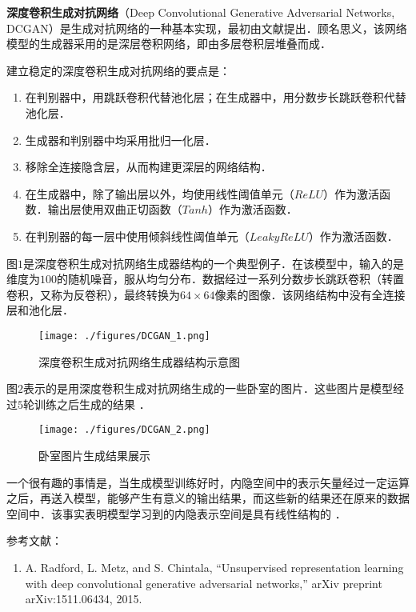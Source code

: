 
\textbf{深度卷积生成对抗网络}（Deep Convolutional Generative Adversarial Networks, DCGAN）是生成对抗网络的一种基本实现，最初由文献\cite{DCGAN}提出．顾名思义，该网络模型的生成器采用的是深层卷积网络，即由多层卷积层堆叠而成．

建立稳定的深度卷积生成对抗网络的要点是\cite{DCGAN}：
\begin{enumerate}
\item 在判别器中，用跳跃卷积代替池化层；在生成器中，用分数步长跳跃卷积代替池化层．
\item 生成器和判别器中均采用批归一化层．
\item 移除全连接隐含层，从而构建更深层的网络结构．
\item 在生成器中，除了输出层以外，均使用线性阈值单元（$ReLU$）作为激活函数．输出层使用双曲正切函数（$Tanh$）作为激活函数．
\item 在判别器的每一层中使用倾斜线性阈值单元（$Leaky ReLU$）作为激活函数．
\end{enumerate}

图$1$是深度卷积生成对抗网络生成器结构的一个典型例子．在该模型中，输入的是维度为$100$的随机噪音，服从均匀分布．数据经过一系列分数步长跳跃卷积（转置卷积，又称为反卷积），最终转换为$64 \times64$像素的图像．该网络结构中没有全连接层和池化层．
\begin{figure}[ht]
\centering
\texttt{[image: ./figures/DCGAN\_1.png]}
\caption{深度卷积生成对抗网络生成器结构示意图 \cite{DCGAN}} \label{DCGAN_fig1}
\end{figure}

图$2$表示的是用深度卷积生成对抗网络生成的一些卧室的图片．这些图片是模型经过$5$轮训练之后生成的结果 \cite{DCGAN}．
\begin{figure}[ht]
\centering
\texttt{[image: ./figures/DCGAN\_2.png]}
\caption{卧室图片生成结果展示} \label{DCGAN_fig2}
\end{figure}

一个很有趣的事情是，当生成模型训练好时，内隐空间中的表示矢量经过一定运算之后，再送入模型，能够产生有意义的输出结果，而这些新的结果还在原来的数据空间中．该事实表明模型学习到的内隐表示空间是具有线性结构的 \cite{DCGAN}．




参考文献：
\begin{enumerate}
\item A. Radford, L. Metz, and S. Chintala, “Unsupervised representation learning with deep convolutional generative adversarial networks,” arXiv preprint arXiv:1511.06434, 2015.
\end{enumerate}
